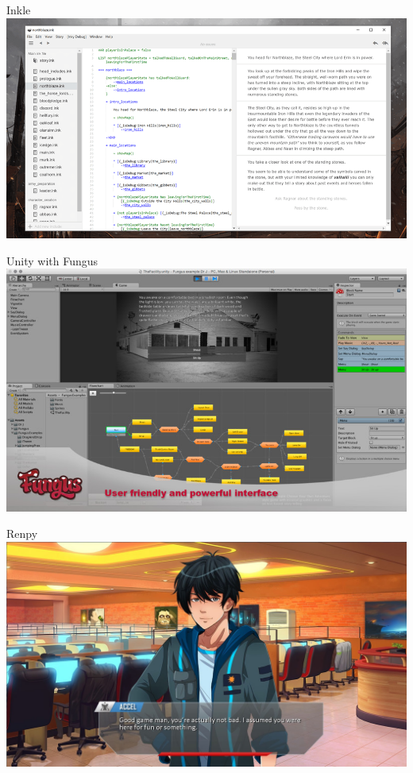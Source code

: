 \begin{frame}{Inkle}
	\includegraphics[width=1.0\textwidth]{inkle}
\end{frame}

\begin{frame}{Unity with Fungus}
	\includegraphics[width=1.0\textwidth]{fungus}
\end{frame}

\begin{frame}{Renpy}
	\includegraphics[width=1.0\textwidth]{renpy}
\end{frame}

